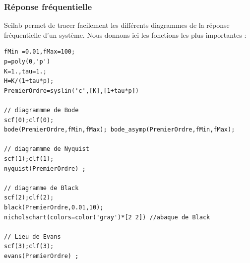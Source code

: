 \subsubsection{Réponse fréquentielle}
Scilab permet de tracer facilement les différents diagrammes de la réponse 
fréquentielle d'un système. Nous donnons ici les fonctions les 
plus importantes : 
\begin{code}
\begin{verbatim}
fMin =0.01,fMax=100;
p=poly(0,'p')
K=1.,tau=1.;
H=K/(1+tau*p);
PremierOrdre=syslin('c',[K],[1+tau*p])

// diagrammme de Bode
scf(0);clf(0);
bode(PremierOrdre,fMin,fMax); bode_asymp(PremierOrdre,fMin,fMax);

// diagrammme de Nyquist
scf(1);clf(1);
nyquist(PremierOrdre) ;

// diagramme de Black
scf(2);clf(2);
black(PremierOrdre,0.01,10);
nicholschart(colors=color('gray')*[2 2]) //abaque de Black

// Lieu de Evans
scf(3);clf(3);
evans(PremierOrdre) ;
\end{verbatim}
\end{code}

